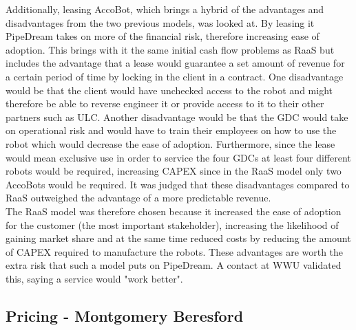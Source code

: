 \documentclass[11pt]{article}		%
\begin{document}
           Additionally, leasing AccoBot, which brings a hybrid of the advantages and disadvantages from the two previous models, was looked at. By leasing it PipeDream takes on more of the financial risk, therefore increasing ease of adoption. This brings with it the same initial cash flow problems as RaaS but includes the advantage that a lease would guarantee a set amount of revenue for a certain period of time by locking in the client in a contract. One disadvantage would be that the client would have unchecked access to the robot and might therefore be able to reverse engineer it or provide access to it to their other partners such as ULC. Another disadvantage would be that the GDC would take on operational risk and would have to train their employees on how to use the robot which would decrease the ease of adoption. Furthermore, since the lease would mean exclusive use in order to service the four GDCs at least four different robots would be required, increasing CAPEX since in the RaaS model only two AccoBots would be required. It was judged that these disadvantages compared to RaaS outweighed the advantage of a more predictable revenue.
           \\
            \hspace*{2ex}
           The RaaS model was therefore chosen because it increased the ease of adoption for the customer (the most important stakeholder), increasing the likelihood of gaining market share and at the same time reduced costs by reducing the amount of CAPEX required to manufacture the robots. These advantages are worth the extra risk that such a model puts on PipeDream. A contact at WWU validated this, saying a service would "work better".%
            
            \subsection[Pricing]{Pricing - Montgomery Beresford} \label{revenue_model}\label{pricing}
                    
\end{document}
